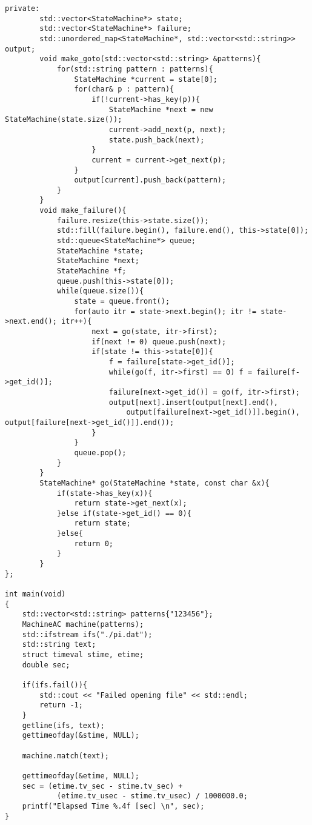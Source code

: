 \begin{lstlisting}[caption=Aho-Corasick,label=hoge]
    private:
        std::vector<StateMachine*> state;
        std::vector<StateMachine*> failure;
        std::unordered_map<StateMachine*, std::vector<std::string>> output;
        void make_goto(std::vector<std::string> &patterns){
            for(std::string pattern : patterns){
                StateMachine *current = state[0];
                for(char& p : pattern){
                    if(!current->has_key(p)){
                        StateMachine *next = new StateMachine(state.size());
                        current->add_next(p, next);
                        state.push_back(next);
                    }
                    current = current->get_next(p);
                }
                output[current].push_back(pattern);
            }
        }
        void make_failure(){
            failure.resize(this->state.size());
            std::fill(failure.begin(), failure.end(), this->state[0]);
            std::queue<StateMachine*> queue;
            StateMachine *state;
            StateMachine *next;
            StateMachine *f;
            queue.push(this->state[0]);
            while(queue.size()){
                state = queue.front();
                for(auto itr = state->next.begin(); itr != state->next.end(); itr++){
                    next = go(state, itr->first);
                    if(next != 0) queue.push(next);
                    if(state != this->state[0]){
                        f = failure[state->get_id()];
                        while(go(f, itr->first) == 0) f = failure[f->get_id()];
                        failure[next->get_id()] = go(f, itr->first);
                        output[next].insert(output[next].end(),
                            output[failure[next->get_id()]].begin(), output[failure[next->get_id()]].end());
                    }
                }
                queue.pop();
            }
        }
        StateMachine* go(StateMachine *state, const char &x){
            if(state->has_key(x)){
                return state->get_next(x);
            }else if(state->get_id() == 0){
                return state;
            }else{
                return 0;
            }
        }
};

int main(void)
{
	std::vector<std::string> patterns{"123456"};
	MachineAC machine(patterns);
	std::ifstream ifs("./pi.dat");
	std::string text;
	struct timeval stime, etime;
	double sec;

	if(ifs.fail()){
		std::cout << "Failed opening file" << std::endl;
		return -1;
	}
	getline(ifs, text);
	gettimeofday(&stime, NULL);

	machine.match(text);

	gettimeofday(&etime, NULL);
	sec = (etime.tv_sec - stime.tv_sec) + 
			(etime.tv_usec - stime.tv_usec) / 1000000.0;
	printf("Elapsed Time %.4f [sec] \n", sec);
}
\end{lstlisting}